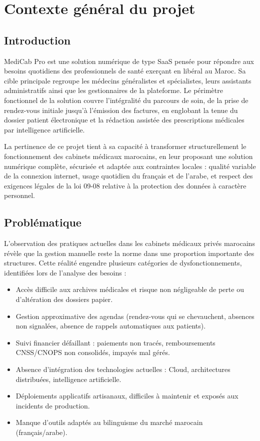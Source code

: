 \chapter{Contexte général du projet}

\section{Introduction}

MediCab Pro est une solution numérique de type SaaS pensée pour répondre aux
besoins quotidiens des professionnels de santé exerçant en libéral au Maroc.
Sa cible principale regroupe les médecins généralistes et spécialistes, leurs
assistants administratifs ainsi que les gestionnaires de la plateforme. Le périmètre
fonctionnel de la solution couvre l'intégralité du parcours de soin, de la prise
de rendez-vous initiale jusqu'à l'émission des factures, en englobant la tenue du
dossier patient électronique et la rédaction assistée des prescriptions médicales
par intelligence artificielle.

La pertinence de ce projet tient à sa capacité à transformer structurellement
le fonctionnement des cabinets médicaux marocains, en leur proposant une solution
numérique complète, sécurisée et adaptée aux contraintes locales : qualité variable
de la connexion internet, usage quotidien du français et de l'arabe, et respect
des exigences légales de la loi 09-08 relative à la protection des données à
caractère personnel.

\section{Problématique}

L'observation des pratiques actuelles dans les cabinets médicaux privés marocains
révèle que la gestion manuelle reste la norme dans une proportion importante des
structures. Cette réalité engendre plusieurs catégories de dysfonctionnements,
identifiées lors de l'analyse des besoins :

\begin{itemize}
  \item Accès difficile aux archives médicales et risque non négligeable de perte
    ou d'altération des dossiers papier.
  \item Gestion approximative des agendas (rendez-vous qui se chevauchent,
    absences non signalées, absence de rappels automatiques aux patients).
  \item Suivi financier défaillant : paiements non tracés, remboursements
    CNSS/CNOPS non consolidés, impayés mal gérés.
  \item Absence d'intégration des technologies actuelles : Cloud, architectures
    distribuées, intelligence artificielle.
  \item Déploiements applicatifs artisanaux, difficiles à maintenir et exposés
    aux incidents de production.
  \item Manque d'outils adaptés au bilinguisme du marché marocain (français/arabe).
\end{itemize}

